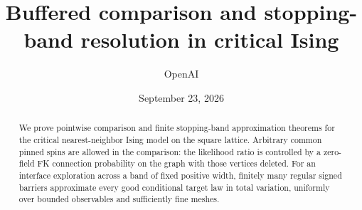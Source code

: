 \documentclass[11pt]{article}
\title{Buffered comparison and stopping-band resolution in critical Ising}
\author{OpenAI}
\date{September 23, 2026}
\begin{document}
\maketitle
\begin{abstract}
We prove pointwise comparison and finite stopping-band approximation
theorems for the critical nearest-neighbor Ising model on the square
lattice. Arbitrary common pinned spins are allowed in the comparison:
the likelihood ratio is controlled by a zero-field FK connection
probability on the graph with those vertices deleted. For an interface
exploration across a band of fixed positive width, finitely many regular
signed barriers approximate every good conditional target law in total
variation, uniformly over bounded observables and sufficiently fine
meshes.
\end{abstract}











\end{document}
